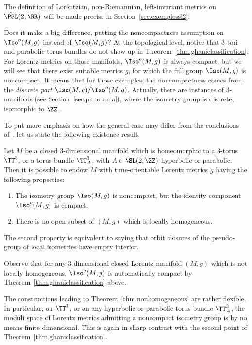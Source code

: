 The definition of Lorentzian, non-Riemannian, left-invariant metrics on $\tilde{\PSL}(2,\RR)$ will be made precise in Section~\ref{sec.exemplessl2}.

Does it make a big difference, putting the noncompactness assumption on $\Iso^o(M,g)$ instead of $\Iso(M,g)$? At the topological level, notice that $3$-tori and parabolic torus bundles do not show up in Theorem~\ref{thm.ghaniclassification}. For Lorentz metrics on those manifolds, $\Iso^o(M,g)$ is always compact, but we will see that there exist suitable metrics $g$, for which the full group $\Iso(M,g)$ is noncompact. It means that for those examples, the noncompactness comes from the \emph{discrete part} $\Iso(M,g)/\Iso^o(M,g)$. Actually, there are instances of $3$-manifolds (see Section~\ref{sec.panorama}), where the isometry group is discrete, isomorphic to $\ZZ$.

To put more emphasis on how the general case may differ from the conclusions of~\cite{zeghibflot}, let us state the following existence result:

\begin{thmx}\label{thm.nonhomogeneous}
Let $M$ be a closed $3$-dimensional manifold which is homeomorphic to a $3$-torus $\TT^3$, or a torus bundle $\TT_A^3$, with $A \in \SL(2,\ZZ)$ hyperbolic or parabolic. Then it is possible to endow $M$ with time-orientable Lorentz metrics $g$ having the following properties:
\begin{enumerate}
\item \label{list2.1}The isometry group $\Iso(M,g)$ is noncompact, but the identity component $\Iso^o(M,g)$ is compact.
\item \label{list2.2}There is no open subset of $(M,g)$ which is locally homogeneous.
\end{enumerate}
\end{thmx}

The second property is equivalent to saying that orbit closures of the pseudo-group of local isometries have empty interior.

Observe that for any $3$-dimensional closed Lorentz manifold $(M,g)$ which is not locally homogeneous, $\Iso^o(M,g)$ is automatically compact by Theorem~\ref{thm.ghaniclassification} above.

The constructions leading to Theorem~\ref{thm.nonhomogeneous} are rather flexible. In particular, on $\TT^3$, or on any hyperbolic or parabolic torus bundle ${\TT_A^3}$, the moduli space of Lorentz metrics admitting a noncompact isometry group is by no means finite dimensional. This is again in sharp contrast with the second point of Theorem~\ref{thm.ghaniclassification}.


